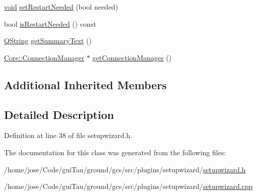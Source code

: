 \begin{DoxyCompactItemize}
\item 
\hyperlink{group___u_a_v_objects_plugin_ga444cf2ff3f0ecbe028adce838d373f5c}{void} \hyperlink{group___setup_ga4e9d50c7eb26a93d5ba6edc45213e071}{set\-Restart\-Needed} (bool needed)
\item 
bool \hyperlink{group___setup_ga882149361d85310b21ac7b62e5fa0abd}{is\-Restart\-Needed} () const 
\item 
\hyperlink{group___u_a_v_objects_plugin_gab9d252f49c333c94a72f97ce3105a32d}{Q\-String} \hyperlink{group___setup_gaf9b2ce464fc2b73f43f648e68a274676}{get\-Summary\-Text} ()
\item 
\hyperlink{class_core_1_1_connection_manager}{Core\-::\-Connection\-Manager} $\ast$ \hyperlink{group___setup_gadf5243c8122542982d190277812b885b}{get\-Connection\-Manager} ()
\end{DoxyCompactItemize}
\subsection*{Additional Inherited Members}


\subsection{Detailed Description}


Definition at line 38 of file setupwizard.\-h.



The documentation for this class was generated from the following files\-:\begin{DoxyCompactItemize}
\item 
/home/jose/\-Code/gui\-Tau/ground/gcs/src/plugins/setupwizard/\hyperlink{setupwizard_8h}{setupwizard.\-h}\item 
/home/jose/\-Code/gui\-Tau/ground/gcs/src/plugins/setupwizard/\hyperlink{setupwizard_8cpp}{setupwizard.\-cpp}\end{DoxyCompactItemize}
